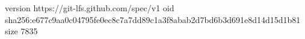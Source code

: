 version https://git-lfs.github.com/spec/v1
oid sha256:e677c9aa0c04795fe0ec8c7a7dd89c1a3f8abab2d7bd6b3d691e8d14d15d1b81
size 7835
